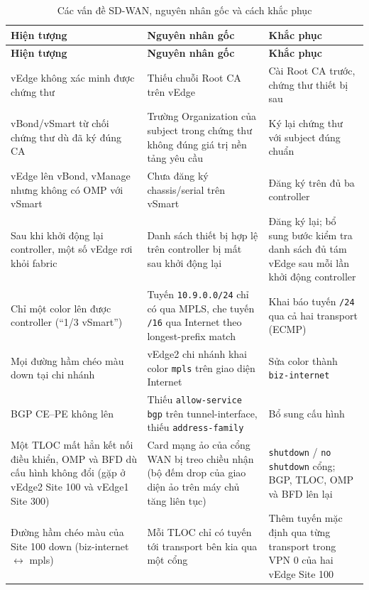 \begingroup
\small
\begin{longtable}{|P{3.0cm}|P{5.2cm}|P{5.3cm}|}
    \caption{Các vấn đề SD-WAN, nguyên nhân gốc và cách khắc phục}\label{tab:loi_sdwan} \\
    \hline
    \textbf{Hiện tượng} & \textbf{Nguyên nhân gốc} & \textbf{Khắc phục} \\
    \hline
    \endfirsthead
    \hline
    \textbf{Hiện tượng} & \textbf{Nguyên nhân gốc} & \textbf{Khắc phục} \\
    \hline
    \endhead
    \hline
    \endfoot
    vEdge không xác minh được chứng thư & Thiếu chuỗi Root CA trên vEdge & Cài Root CA trước, chứng thư thiết bị sau \\
    \hline
    vBond/vSmart từ chối chứng thư dù đã ký đúng CA & Trường Organization của subject trong chứng thư không đúng giá trị nền tảng yêu cầu & Ký lại chứng thư với subject đúng chuẩn \\
    \hline
    vEdge lên vBond, vManage nhưng không có OMP với vSmart & Chưa đăng ký chassis/serial trên vSmart & Đăng ký trên đủ ba controller \\
    \hline
    Sau khi khởi động lại controller, một số vEdge rơi khỏi fabric & Danh sách thiết bị hợp lệ trên controller bị mất sau khởi động lại & Đăng ký lại; bổ sung bước kiểm tra danh sách đủ tám vEdge sau mỗi lần khởi động controller \\
    \hline
    Chỉ một color lên được controller (``1/3 vSmart'') & Tuyến \texttt{10.9.0.0/24} chỉ có qua MPLS, che tuyến \texttt{/16} qua Internet theo longest-prefix match & Khai báo tuyến \texttt{/24} qua cả hai transport (ECMP) \\
    \hline
    Mọi đường hầm chéo màu down tại chi nhánh & vEdge2 chi nhánh khai color \texttt{mpls} trên giao diện Internet & Sửa color thành \texttt{biz-internet} \\
    \hline
    BGP CE--PE không lên & Thiếu \texttt{allow-service bgp} trên tunnel-interface, thiếu \texttt{address-family} & Bổ sung cấu hình \\
    \hline
    Một TLOC mất hẳn kết nối điều khiển, OMP và BFD dù cấu hình không đổi (gặp ở vEdge2 Site 100 và vEdge1 Site 300) & Card mạng ảo của cổng WAN bị treo chiều nhận (bộ đếm drop của giao diện ảo trên máy chủ tăng liên tục) & \texttt{shutdown} / \texttt{no shutdown} cổng; BGP, TLOC, OMP và BFD lên lại \\
    \hline
    Đường hầm chéo màu của Site 100 down (biz-internet $\leftrightarrow$ mpls) & Mỗi TLOC chỉ có tuyến tới transport bên kia qua một cổng & Thêm tuyến mặc định qua từng transport trong VPN 0 của hai vEdge Site 100 \\

\end{longtable}
